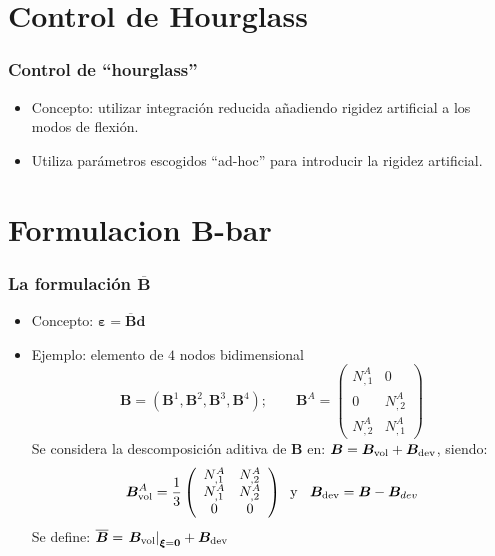 \documentclass[handout]{beamer}
\begin{document}
\section{Control de Hourglass}
\begin{frame}
\frametitle{Control de ``hourglass''}
\begin{itemize}
\item Concepto: utilizar integración reducida añadiendo rigidez artificial a
los modos de flexión.
\item Utiliza parámetros escogidos 
``ad-hoc'' para introducir la rigidez artificial.
\end{itemize}
\end{frame}
\section{Formulacion B-bar}
\begin{frame}
\frametitle{La formulación $\overline{\bm{B}}$}
\begin{itemize}
\item Concepto: $\bm{\varepsilon}=\overline{\bm{B}} \bm{d}$
\item Ejemplo: elemento de $4$ nodos bidimensional
$$\bm{B}=(\bm{B}^{1},\bm{B}^2,\bm{B}^3,\bm{B}^4); \qquad
\bm{B}^{A}=\left(
\begin{array}{cc}
N^{A}_{,1}&0\\
0&N^{A}_{,2}\\
N^{A}_{,2}&N^{A}_{,1}
\end{array}
\right)
$$
Se considera la descomposición aditiva de $\bm{B}$ en:
$\bm{B}=\bm{B}_{\rm vol}+\bm{B}_{\rm dev}$,
siendo:
$$\bm{B}^{A}_{\rm vol}=\frac{1}{3}
\left(
\begin{array}{cc}
N^{A}_{,1}&N^{A}_{,2}\\
N^{A}_{,1}&N^{A}_{,2}\\
0&0
\end{array}
\right)
\;\;\mbox{y }\;\; \bm{B}_{\rm dev}=\bm{B}-\bm{B}_{dev}$$
Se define:
$\overline{\bm{B}}=\left. \bm{B}_{\rm vol}\right|_{\bm{\xi}=\bm{0}}+\bm{B}_{\rm dev}$
\end{itemize}
\end{frame}
\end{document}
